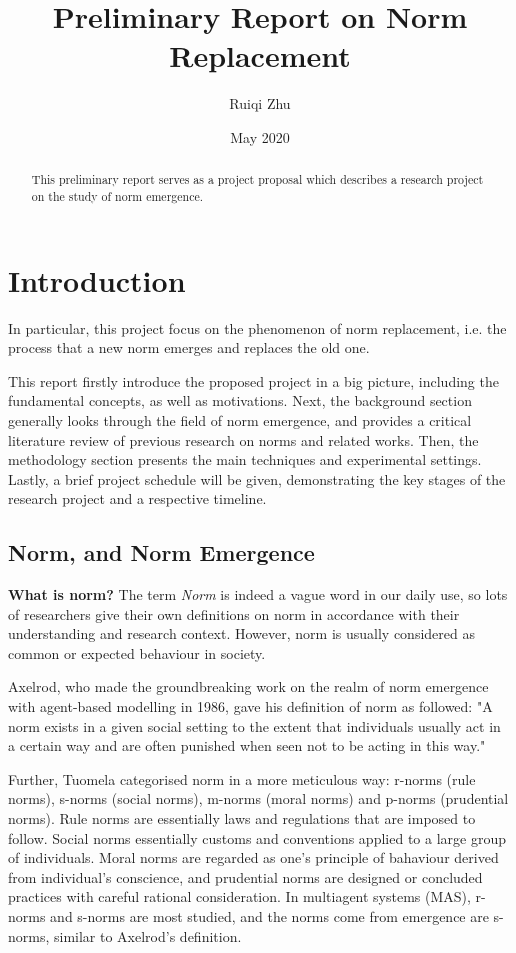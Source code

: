 \documentclass[12pt]{extarticle}
\title{Preliminary Report on Norm Replacement}
\author{Ruiqi Zhu}
\date{May 2020}
\begin{document}
\maketitle
\setlength{\parskip}{0.5em}

\begin{abstract}
This preliminary report serves as a project proposal which describes a research project on the study of norm emergence. 

\end{abstract}

\section{Introduction}
In particular, this project focus on the phenomenon of norm replacement, i.e. the process that a new norm emerges and replaces the old one. 

This report firstly introduce the proposed project in a big picture, including the fundamental concepts, as well as motivations. Next, the background section generally looks through the field of norm emergence, and provides a critical literature review of previous research on norms and related works. Then, the methodology section presents the main techniques and experimental settings.  Lastly, a brief project schedule will be given, demonstrating the key stages of the research project and a respective timeline. 

\subsection{Norm, and Norm Emergence}
\textbf{What is norm?} The term \textit{Norm} is indeed a vague word in our daily use, so lots of researchers give their own definitions on norm in accordance with their understanding and research context. However, norm is usually considered as common or expected behaviour in society. 

Axelrod, who made the groundbreaking work on the realm of norm emergence with agent-based modelling in 1986\cite{axelrod1986evolutionary}, gave his definition of norm as followed: "A norm exists in a given social setting to the extent that individuals usually act in a certain way and are often punished when seen not to be acting in this way."

Further, Tuomela categorised norm in a more meticulous way: r-norms (rule norms), s-norms (social norms), m-norms (moral norms) and p-norms (prudential norms)\cite{tuomela_1996}. Rule norms are essentially laws and regulations that are imposed to follow. Social norms essentially customs and conventions applied to a large group of individuals. Moral norms are regarded as one's principle of bahaviour derived from individual’s conscience, and prudential norms are designed or concluded practices with careful rational consideration. In multiagent systems (MAS), r-norms and s-norms are most studied, and the norms come from emergence are s-norms, similar to Axelrod's definition.
\end{document}

